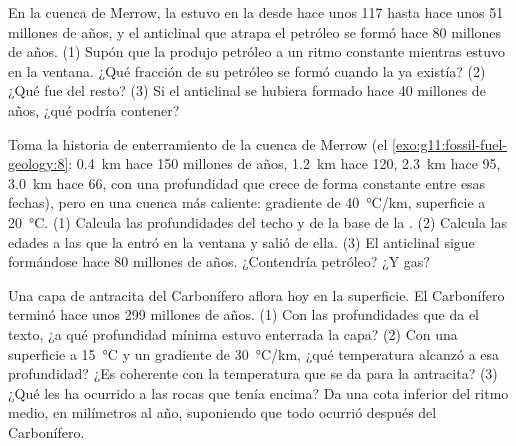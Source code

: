 \begin{exercise}[$\star\star\star$]\label{exo:g11:fossil-fuel-geology:13}
En la cuenca de Merrow, la  estuvo en la 
desde hace unos 117 hasta hace unos 51 millones de años, y el anticlinal que
atrapa el petróleo se formó hace 80 millones de años. (1) Supón que la  produjo petróleo a un ritmo constante mientras estuvo en la
ventana. ¿Qué fracción de su petróleo se formó cuando la  ya existía?
(2) ¿Qué fue del resto? (3) Si el anticlinal se hubiera formado hace 40
millones de años, ¿qué podría contener?
\end{exercise}

\begin{exercise}[$\star\star\star$]\label{exo:g11:fossil-fuel-geology:14}
Toma la historia de enterramiento de la cuenca de Merrow (el \cref{exo:g11:fossil-fuel-geology:8}:
\qty{0.4}{km} hace 150 millones de años, \qty{1.2}{km} hace 120, \qty{2.3}{km}
hace 95, \qty{3.0}{km} hace 66, con una profundidad que crece de forma
constante entre esas fechas), pero en una cuenca más caliente: gradiente de
\qty{40}{\degreeCelsius/km}, superficie a \qty{20}{\degreeCelsius}.
(1) Calcula las profundidades del techo y de la base de la . (2) Calcula las edades a las que la  entró en la
ventana y salió de ella. (3) El anticlinal sigue formándose hace 80 millones
de años. ¿Contendría petróleo? ¿Y gas?
\end{exercise}

\begin{exercise}[$\star\star\star$]\label{exo:g11:fossil-fuel-geology:15}
Una capa de antracita del Carbonífero aflora hoy en la superficie. El
Carbonífero terminó hace unos 299 millones de años. (1) Con las profundidades
que da el texto, ¿a qué profundidad mínima estuvo enterrada la capa? (2) Con
una superficie a \qty{15}{\degreeCelsius} y un gradiente de
\qty{30}{\degreeCelsius/km}, ¿qué temperatura alcanzó a esa profundidad? ¿Es
coherente con la temperatura que se da para la antracita? (3) ¿Qué les ha
ocurrido a las rocas que tenía encima? Da una cota inferior del ritmo medio,
en milímetros al año, suponiendo que todo ocurrió después del Carbonífero.
\end{exercise}

